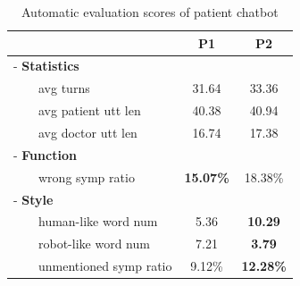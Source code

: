 \begin{table}[th]
    \footnotesize
    \centering
    \begin{tabular}{l|cc}
    \hline
    & P1 & P2 \\ 
    \hline
    - \textbf{Statistics} & & \\
    ~~~~avg turns & 31.64 & 33.36\\
    ~~~~avg patient utt len & 40.38 & 40.94 \\
    ~~~~avg doctor utt len & 16.74 & 17.38 \\
    \hline
    - \textbf{Function} & & \\
    ~~~~wrong symp ratio & \textbf{15.07\%} & 18.38\%   \\
    \hline
    - \textbf{Style} & & \\
    ~~~~human-like word num & 5.36 & \textbf{10.29}   \\
    ~~~~robot-like word num & 7.21 & \textbf{3.79} 	  \\
    ~~~~unmentioned symp ratio &  9.12\% & \textbf{12.28\%} \\
    \hline
    \end{tabular}
    \caption{Automatic evaluation scores of patient chatbot}
    \label{tab:auto_pat}
\end{table}


